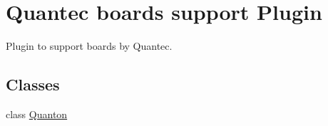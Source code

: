 \hypertarget{group___boards___quantec}{\section{Quantec boards support Plugin}
\label{group___boards___quantec}
}


Plugin to support boards by Quantec.  


\subsection*{Classes}
\begin{DoxyCompactItemize}
\item 
class \hyperlink{class_quanton}{Quanton}
\end{DoxyCompactItemize}
